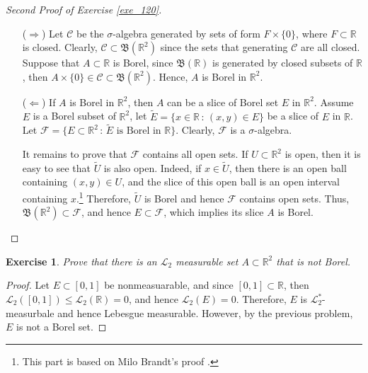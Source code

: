 \documentclass[11pt]{book}
\newtheorem{exercise}{Exercise}[chapter]
\theoremstyle{definition}
\numberwithin{equation}{chapter}
\begin{document}
\begin{proof}[Second Proof of Exercise \ref{exe_120}]
~\begin{enumerate}
    \item[($\Rightarrow$)] Let $\mathcal{C}$ be the $\sigma$-algebra generated by sets of form $F \times \{0\}$, where $F \subset \mathbb{R}$ is closed. Clearly, $\mathcal{C} \subset \mathfrak{B}(\mathbb{R}^2)$ since the sets that generating $\mathcal{C}$ are all closed. Suppose that $A \subset \mathbb{R}$ is Borel, since $\mathfrak{B}(\mathbb{R})$ is generated by closed subsets of $\mathbb{R}$, then $A \times \{0\} \in \mathcal{C} \subset \mathfrak{B}(\mathbb{R}^2)$. Hence, $A$ is Borel in $\mathbb{R}^2$.
    
    \item[($\Leftarrow$)] If $A$ is Borel in $\mathbb{R}^2$, then $A$ can be a slice of Borel set $E$ in $\mathbb{R}^2$. Assume $E$ is a Borel subset of $\mathbb{R}^2$, let $\widetilde{E} = \{x \in \mathbb{R}\,:\, (x,y) \in E\}$ be a slice of $E$ in $\mathbb{R}$. Let $\mathcal{F} = \{E \subset \mathbb{R}^2\,:\, \widetilde{E}\,\,\text{is Borel in $\mathbb{R}$}\}$. Clearly, $\mathcal{F}$ is a $\sigma$-algebra.
    
    It remains to prove that $\mathcal{F}$ contains all open sets. If $U \subset \mathbb{R}^2$ is open, then it is easy to see that $\widetilde{U}$ is also open. Indeed, if $x \in \widetilde{U}$, then there is an open ball containing $(x,y) \in U$, and the slice of this open ball is an open interval containing $x$.\footnote{This part is based on Milo Brandt's proof \cite{24}.} Therefore, $\widetilde{U}$ is Borel and hence $\mathcal{F}$ contains open sets. Thus, $\mathfrak{B}(\mathbb{R}^2) \subset \mathcal{F}$, and hence $E \subset \mathcal{F}$, which implies its slice $A$ is Borel.
\end{enumerate}
\end{proof}

\medskip

\begin{exercise}
Prove that there is an $\mathcal{L}_2$ measurable set $A\subset\mathbb{R}^2$ that is not Borel.
\end{exercise}
\begin{proof}
Let $E \subset [0,1]$ be nonmeasuarable, and since $[0,1] \subset \mathbb{R}$, then $\mathcal{L}_2([0,1]) \leq \mathcal{L}_2(\mathbb{R}) = 0$, and hence $\mathcal{L}_2(E) = 0$. Therefore, $E$ is $\mathcal{L}^*_2$-measurbale and hence Lebesgue measurable. However, by the previous problem, $E$ is not a Borel set.
\end{proof}
\end{document}
